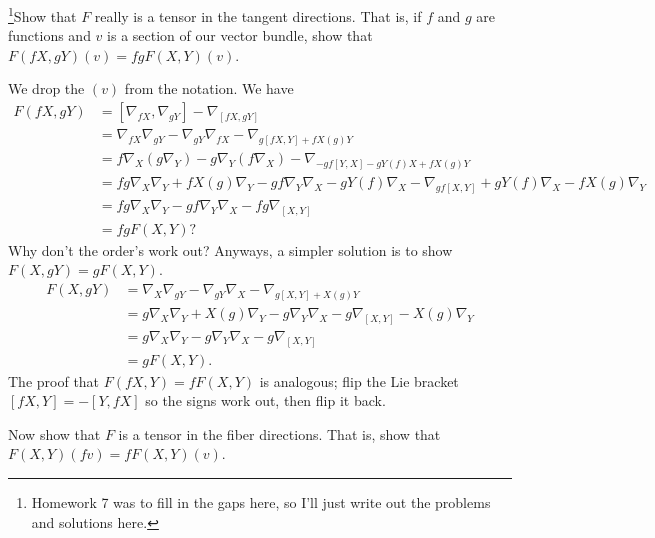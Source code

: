 \begin{problem}
\footnote{Homework 7 was to fill in the gaps here, so I'll just write out the problems and solutions here.}Show that $F$ really is a tensor in the tangent directions. That is, if $f$ and $g$ are functions and $v$ is a section of our vector bundle, show that $F(fX,gY)(v)=fg F(X,Y)(v)$.
\end{problem}
\begin{solution}
    We drop the $(v)$ from the notation. We have 
\begin{align*}
    F(fX,gY)&=[\nabla_{fX},\nabla_{gY}]-\nabla_{[fX,gY]}\\
               &=\nabla_{fX}\nabla_{gY}-\nabla_{gY}\nabla_{fX}-\nabla_{g[fX,Y]+fX(g)Y}\\
               &=f\nabla_{X}(g\nabla_Y)-g\nabla_Y(f\nabla_X)-\nabla_{-gf[Y,X]-gY(f)X+fX(g)Y}\\
               &=fg\nabla_X\nabla_Y+fX(g)\nabla_Y-gf\nabla_Y\nabla_X-gY(f)\nabla_X-\nabla_{gf[X,Y]}+gY(f)\nabla_X-fX(g)\nabla_Y\\
               &=fg\nabla_X\nabla_Y-gf\nabla_Y\nabla_X-fg\nabla_{[X,Y]}\\
               &=fgF(X,Y)?
\end{align*}Why don't the order's work out? Anyways, a simpler solution is to show $F(X,gY)=gF(X,Y)$. 
\begin{align*}
    F(X,gY)&=\nabla_X\nabla_{gY}-\nabla_{gY}\nabla_X-\nabla_{g[X,Y]+X(g)Y}\\
           &=g\nabla_X\nabla_Y+X(g)\nabla_Y-g\nabla_Y\nabla_X- g\nabla_{[X,Y]}-X(g)\nabla_Y\\
           &=g\nabla_X\nabla_Y-g\nabla_Y\nabla_X-g\nabla_{[X,Y]}\\
           &=gF(X,Y).
\end{align*}The proof that $F(fX,Y)=fF(X,Y)$ is analogous; flip the Lie bracket $[fX,Y]=-[Y,fX]$ so the signs work out, then flip it back.
\end{solution}
\begin{problem}
    Now show that $F$ is a tensor in the fiber directions. That is, show that $F(X,Y)(fv)=fF(X,Y)(v)$.
\end{problem}
